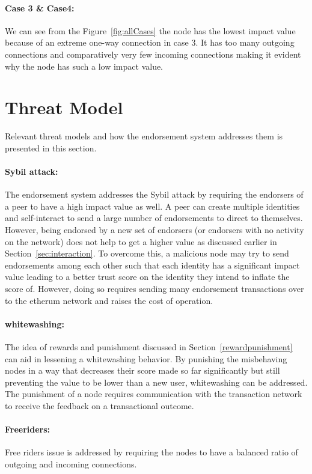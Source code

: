 \paragraph{Case 3 \& Case4:}We can see from the Figure~\ref{fig:allCases} the
node has the lowest impact value because of an extreme one-way connection in
case 3. It has too many outgoing connections and comparatively very few
incoming connections making it evident why the node has such a low impact
value. 

\section{Threat Model}\label{sec:threatModel}
Relevant threat models and how the endorsement system addresses them is
presented in this section. 
\paragraph{Sybil attack:} The endorsement system addresses the Sybil attack by
requiring the endorsers of a peer to have a high impact value as well. A peer
can create multiple identities and self-interact to send a large number of
endorsements to direct to themselves. However, being endorsed by a new set of
endorsers (or endorsers with no activity on the network) does not help to get a
higher value as discussed earlier in Section~\ref{sec:interaction}. To overcome
this, a malicious node may try to send endorsements among each other such that
each identity has a significant impact value leading to a better trust score on
the identity they intend to inflate the score of. However, doing so requires
sending many endorsement transactions over to the etherum network and raises
the cost of operation. 
\paragraph{whitewashing:}The idea of rewards and punishment discussed in
Section~\ref{rewardpunishment} can aid in lessening a whitewashing behavior. By
punishing the misbehaving nodes in a way that decreases their score made so far
significantly but still preventing the value to be lower than a new user,
whitewashing can be addressed. The punishment of a node requires communication
with the transaction network to receive the feedback on a transactional
outcome. 
\paragraph{Freeriders:} Free riders issue is addressed by requiring the nodes
to have a balanced ratio of outgoing and incoming connections.

